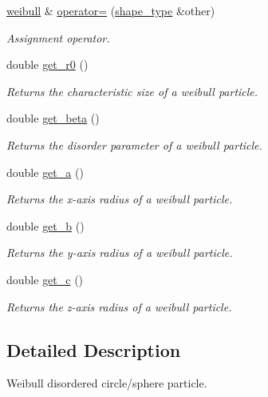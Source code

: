 \begin{DoxyCompactItemize}
\hyperlink{classparticle_1_1shape_1_1weibull}{weibull} \& \hyperlink{classparticle_1_1shape_1_1weibull_a682194c48696724e2290373b8c35577a}{operator=} (\hyperlink{classparticle_1_1shape_1_1shape__type}{shape\+\_\+type} \&other)
\begin{DoxyCompactList}\small\item\em Assignment operator. \end{DoxyCompactList}\item 
double \hyperlink{classparticle_1_1shape_1_1weibull_a85ab45f804ae9aa3fb712c435125ff70}{get\+\_\+r0} ()
\begin{DoxyCompactList}\small\item\em Returns the characteristic size of a weibull particle. \end{DoxyCompactList}\item 
double \hyperlink{classparticle_1_1shape_1_1weibull_a640180ce2bd6ce7f68c10d4791bce49c}{get\+\_\+beta} ()
\begin{DoxyCompactList}\small\item\em Returns the disorder parameter of a weibull particle. \end{DoxyCompactList}\item 
double \hyperlink{classparticle_1_1shape_1_1weibull_a0234fa42b67465c7191248f524f27a0e}{get\+\_\+a} ()
\begin{DoxyCompactList}\small\item\em Returns the x-\/axis radius of a weibull particle. \end{DoxyCompactList}\item 
double \hyperlink{classparticle_1_1shape_1_1weibull_a1066adcab828f8636475128ff51c56f0}{get\+\_\+b} ()
\begin{DoxyCompactList}\small\item\em Returns the y-\/axis radius of a weibull particle. \end{DoxyCompactList}\item 
double \hyperlink{classparticle_1_1shape_1_1weibull_a0b8c38944e502df7bce4e8f99d149237}{get\+\_\+c} ()
\begin{DoxyCompactList}\small\item\em Returns the z-\/axis radius of a weibull particle. \end{DoxyCompactList}\end{DoxyCompactItemize}


\subsection{Detailed Description}
Weibull disordered circle/sphere particle. 

